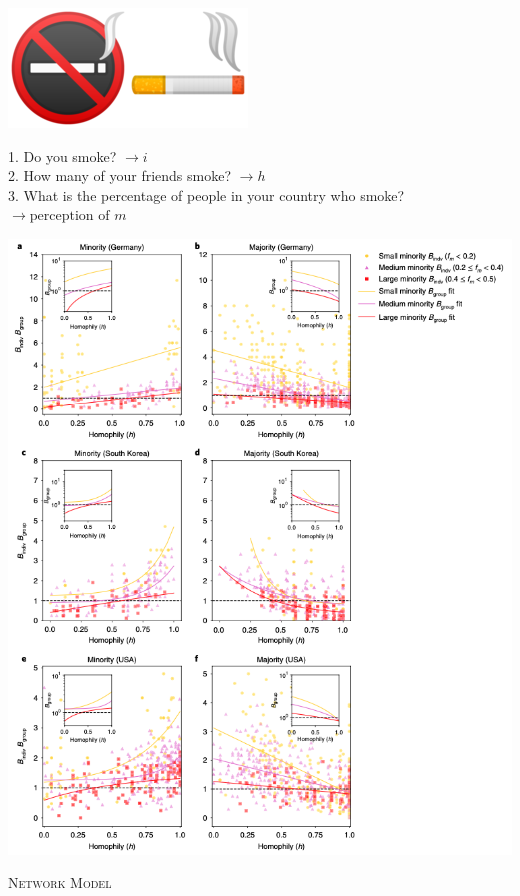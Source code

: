 \documentclass{beamer}
\begin{document}
\begin{frame}
\begin{center}
    \includegraphics[width=.1\textwidth]{static/no-smoke.png}\includegraphics[width=.1\textwidth]{static/smoke.png}
\end{center}
\pause
\Large
1. Do you smoke? $\rightarrow i$ \\
2. How many of your friends smoke? $\rightarrow h$ \\
3. What is the percentage of people in your country who smoke? $\rightarrow \text{perception of } m$ \\
\end{frame}

\begin{frame}
    \begin{center}
        \includegraphics[width=.55\textwidth]{static/survey_results.png}
    \end{center}
\end{frame}

\begin{frame}
    \centering
    \Large{\textsc{Network Model}} \\ \vspace{1cm}
    \pause
     
\end{frame}
\end{document}
